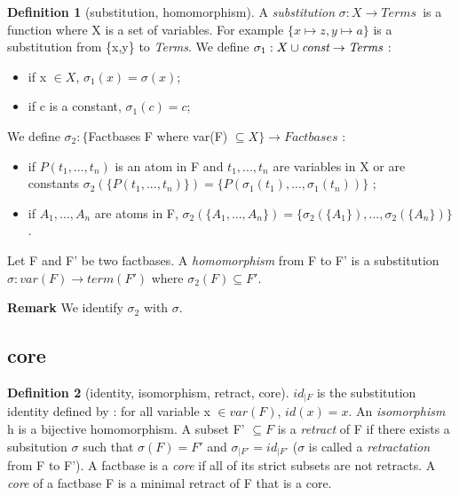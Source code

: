 \documentclass{article}
\theoremstyle{proposal}
\theoremstyle{definition}
\newtheorem{definition}{Definition}[section]
\theoremstyle{theorem}
\theoremstyle{example}
\theoremstyle{remark}
\begin{document}
\begin{definition}[substitution, homomorphism]
A \emph{substitution} $\sigma:X \to \textit{Terms}$\ is a function where X is a set of variables. For example $\{x \mapsto z, y \mapsto a \}$ is a substitution from \{x,y\} to \textit{Terms}. We define $\sigma_1:X \cup \emph{const} \to \textit{Terms}$ :
\begin{itemize}
\item if x $\in X$, $\sigma_1(x) = \sigma(x)$;
\item if c is a constant, $\sigma_1(c) = c$;
\end{itemize}
We define $\sigma_2:\{$Factbases F where var(F) $\subseteq X\} \to \textit{Factbases}$ :
\begin{itemize}
\item if $P(t_{1},...,t_{n})$ is an atom in F and $t_1,...,t_n$ are variables in X or are constants $\sigma_2(\{P(t_{1},...,t_{n})\}) = \{P(\sigma_1(t_{1}),...,\sigma_1(t_{n}))\}$ ;
\item if $A_{1},...,A_{n}$ are atoms in F, $\sigma_2(\{A_{1},...,A_{n}\}) = \{\sigma_2(\{A_{1}\}),...,\sigma_2(\{A_{n}\})\}$.
\end{itemize}
Let F and F' be two factbases. A \emph{homomorphism} from F to F' is a substitution $\sigma:var(F) \to term(F')$ where $\sigma_2(F) \subseteq F'$. 
\end{definition}

\noindent \textbf{Remark} We identify $\sigma_2$ with $\sigma$.

\subsection{core}

\begin{definition}[identity, isomorphism, retract, core]
$id_{|F}$ is the substitution identity defined by : for all variable x $\in var(F)$, $id(x) = x$. An \emph{isomorphism} h is a bijective homomorphism.  A subset F' $\subseteq F$ is a \emph{retract} of F if there exists a subsitution $\sigma$ such that $\sigma(F) = F'$ and $\sigma_{|F'}=id_{|F'}$ ($\sigma$ is called a \emph{retractation} from F to F'). A factbase is a \emph{core} if all of its strict subsets are not retracts. A \emph{core} of a factbase F is a minimal retract of F that is a core.
\end{definition}
\end{document}
